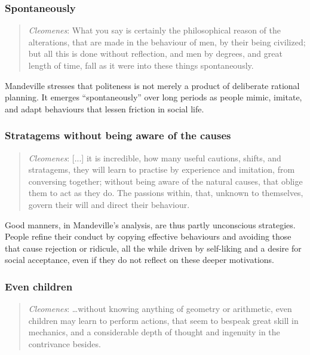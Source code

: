        \subsubsection{Spontaneously}

            \begin{quote}
                \textit{Cleomenes}: What you say is certainly the philosophical reason of the alterations, that are made in the behaviour of men, by their being civilized; but all this is done without reflection, and men by degrees, and great length of time, fall as it were into these things spontaneously.
            \end{quote}

            Mandeville stresses that politeness is not merely a product of deliberate rational planning. It emerges “spontaneously” over long periods as people mimic, imitate, and adapt behaviours that lessen friction in social life.

        \subsubsection{Stratagems without being aware of the causes}

            \begin{quote}
                \textit{Cleomenes}: [...] it is incredible, how many useful cautions, shifts, and stratagems, they will learn to practise by experience and imitation, from conversing together; without being aware of the natural causes, that oblige them to act as they do. The passions within, that, unknown to themselves, govern their will and direct their behaviour.
            \end{quote}

            Good manners, in Mandeville’s analysis, are thus partly unconscious strategies. People refine their conduct by copying effective behaviours and avoiding those that cause rejection or ridicule, all the while driven by self-liking and a desire for social acceptance, even if they do not reflect on these deeper motivations.

        \subsubsection{Even children}

            \begin{quote}
                \textit{Cleomenes}: …without knowing anything of geometry or arithmetic, even children may learn to perform actions, that seem to bespeak great skill in mechanics, and a considerable depth of thought and ingenuity in the contrivance besides.
            \end{quote}


